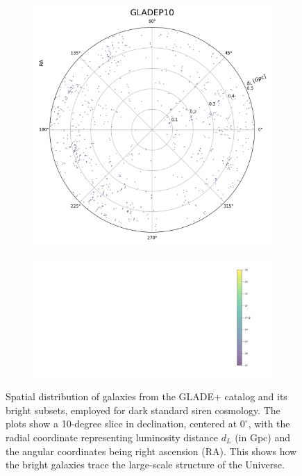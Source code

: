 \begin{figure}[h!]
  \vspace{0.5em}

  \begin{subfigure}{0.32\textwidth}
    \includegraphics[width=\linewidth]{figures/test_frame_g_9.png}
    \label{fig:gladep10}
  \end{subfigure}
  \begin{subfigure}{0.64\textwidth}
    \centering
    \includegraphics[width=\linewidth]{figures/test_frame_g_colorbar.png}
    \vspace{0.02em}
  \end{subfigure}

  \caption[Spatial distribution of galaxies from the GLADE+ galaxy catalog and its subsets.]{Spatial distribution of galaxies from the GLADE+ catalog and its bright subsets, employed for dark standard siren cosmology. The plots show a 10-degree slice in declination, centered at $0^\circ$, with the radial coordinate representing luminosity distance $d_L$ (in Gpc) and the angular coordinates being right ascension (RA). This shows how the bright galaxies trace the large-scale structure of the Universe.}
  \label{fig:dist_gladep}
\end{figure}


